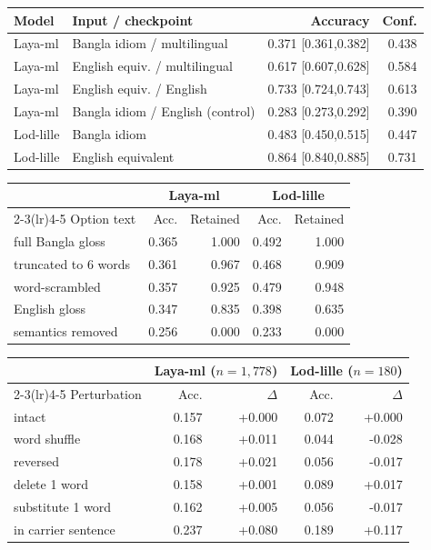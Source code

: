 \begin{tabular}{llrr}
\toprule
Model & Input / checkpoint & Accuracy & Conf. \\
\midrule
Laya-ml & Bangla idiom / multilingual & 0.371 \tiny[0.361,0.382] & 0.438 \\
Laya-ml & English equiv. / multilingual & 0.617 \tiny[0.607,0.628] & 0.584 \\
Laya-ml & English equiv. / English & 0.733 \tiny[0.724,0.743] & 0.613 \\
Laya-ml & Bangla idiom / English (control) & 0.283 \tiny[0.273,0.292] & 0.390 \\
Lod-lille & Bangla idiom & 0.483 \tiny[0.450,0.515] & 0.447 \\
Lod-lille & English equivalent & 0.864 \tiny[0.840,0.885] & 0.731 \\
\bottomrule
\end{tabular}

\begin{tabular}{lrrrr}
\toprule
& \multicolumn{2}{c}{Laya-ml} & \multicolumn{2}{c}{Lod-lille} \\
\cmidrule(lr){2-3}\cmidrule(lr){4-5}
Option text & Acc. & Retained & Acc. & Retained \\
\midrule
full Bangla gloss & 0.365 & 1.000 & 0.492 & 1.000 \\
truncated to 6 words & 0.361 & 0.967 & 0.468 & 0.909 \\
word-scrambled & 0.357 & 0.925 & 0.479 & 0.948 \\
English gloss & 0.347 & 0.835 & 0.398 & 0.635 \\
semantics removed & 0.256 & 0.000 & 0.233 & 0.000 \\
\bottomrule
\end{tabular}

\begin{tabular}{lrrrr}
\toprule
& \multicolumn{2}{c}{Laya-ml ($n{=}1{,}778$)} & \multicolumn{2}{c}{Lod-lille ($n{=}180$)} \\
\cmidrule(lr){2-3}\cmidrule(lr){4-5}
Perturbation & Acc. & $\Delta$ & Acc. & $\Delta$ \\
\midrule
intact & 0.157 & +0.000 & 0.072 & +0.000 \\
word shuffle & 0.168 & +0.011 & 0.044 & -0.028 \\
reversed & 0.178 & +0.021 & 0.056 & -0.017 \\
delete 1 word & 0.158 & +0.001 & 0.089 & +0.017 \\
substitute 1 word & 0.162 & +0.005 & 0.056 & -0.017 \\
in carrier sentence & 0.237 & +0.080 & 0.189 & +0.117 \\
\bottomrule
\end{tabular}